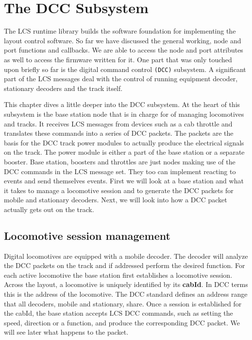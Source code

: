 \chapter{The DCC Subsystem}

The LCS runtime library builds the software foundation for implementing the layout control software. So far we have discussed the general working, node and port functions and callbacks. We are able to access the node and port attributes as well to access the firmware written for it. One part that was only touched upon briefly so far is the digital command control \texttt{(DCC)} subsystem. A significant part of the LCS messages deal with the control of running equipment decoder, stationary decoders and the track itself.

This chapter dives a little deeper into the DCC subsystem. At the heart of this subsystem is the base station node that is in charge for of managing locomotives and tracks. It receives LCS messages from devices such as a cab throttle and translates these commands into a series of DCC packets. The packets are the basis for the DCC track power modules to actually produce the electrical signals on the track. The power module is either a part of the base station or a separate booster. Base station, boosters and throttles are just nodes making use of the DCC commands in the LCS message set. They too can implement reacting to events and send themselves events. First we will look at a base station and what it takes to manage a locomotive session and to generate the DCC packets for mobile and stationary decoders. Next, we will look into how a DCC packet actually gets out on the track.

\section{Locomotive session management}

Digital locomotives are equipped with a mobile decoder. The decoder will analyze the DCC packets on the track and if addressed perform the desired function. For each active locomotive the base station first establishes a locomotive session. Across the layout, a locomotive is uniquely identified by its \textbf{cabId}. In DCC terms this is the address of the locomotive. The DCC standard defines an address range that all decoders, mobile and stationary, share. Once a session is established for the cabId, the base station accepts LCS DCC commands, such as setting the speed, direction or a function, and produce the corresponding DCC packet. We will see later what happens to the packet.

